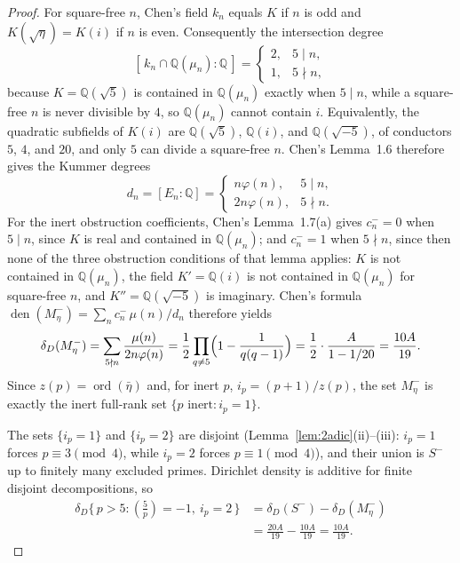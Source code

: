 \documentclass[11pt]{amsart}
\theoremstyle{plain}
\theoremstyle{definition}
\newcommand{\leg}[2]{\left(\frac{#1}{#2}\right)}
\begin{document}
\begin{proof}
For square-free $n$, Chen's field $k_n$ equals $K$ if $n$ is odd and
$K(\sqrt\eta)=K(i)$ if $n$ is even. Consequently the intersection
degree
\[
[\,k_n\cap\mathbb Q(\mu_n):\mathbb Q\,]
=
\begin{cases}
2,&5\mid n,\\
1,&5\nmid n,
\end{cases}
\]
because $K=\mathbb Q(\sqrt5)$ is contained in $\mathbb Q(\mu_n)$
exactly when $5\mid n$, while a square-free $n$ is never divisible
by $4$, so $\mathbb Q(\mu_n)$ cannot contain $i$. Equivalently, the
quadratic subfields of $K(i)$ are $\mathbb Q(\sqrt5)$, $\mathbb Q(i)$,
and $\mathbb Q(\sqrt{-5})$, of conductors $5$, $4$, and $20$, and only
$5$ can divide a square-free $n$. Chen's
Lemma~1.6 \cite{Chen2002} therefore gives the Kummer degrees
\[
d_n=[E_n:\mathbb Q]=
\begin{cases}
n\varphi(n),&5\mid n,\\[2pt]
2n\varphi(n),&5\nmid n.
\end{cases}
\]
For the inert obstruction coefficients, Chen's Lemma~1.7(a)
\cite{Chen2002} gives $c_n^-=0$ when $5\mid n$, since $K$ is real
and contained in $\mathbb Q(\mu_n)$; and $c_n^-=1$ when
$5\nmid n$, since then none of the three obstruction conditions of
that lemma applies: $K$ is not contained in $\mathbb Q(\mu_n)$, the
field $K'=\mathbb Q(i)$ is not contained in $\mathbb Q(\mu_n)$ for
square-free $n$, and $K''=\mathbb Q(\sqrt{-5})$ is imaginary.
Chen's formula
$\operatorname{den}(M_\eta^-)=\sum_n c_n^-\,\mu(n)/d_n$
\cite[Theorem~2.1]{Chen2002} therefore yields
\[
\delta_D(M_\eta^-)
=\sum_{5\nmid n}\frac{\mu(n)}{2n\varphi(n)}
=\frac12\prod_{q\ne5}\Bigl(1-\frac1{q(q-1)}\Bigr)
=\frac12\cdot\frac{A}{1-1/20}
=\frac{10A}{19}.
\]
Since $z(p)=\operatorname{ord}(\bar\eta)$ and, for inert $p$,
$i_p=(p+1)/z(p)$, the set $M_\eta^-$ is exactly the inert full-rank
set $\{p\text{ inert}: i_p=1\}$.

The sets $\{i_p=1\}$ and $\{i_p=2\}$ are disjoint
(Lemma~\ref{lem:2adic}(ii)--(iii): $i_p=1$ forces
$p\equiv3\pmod4$, while $i_p=2$ forces $p\equiv1\pmod4$), and their
union is $S^-$ up to finitely many excluded primes. Dirichlet
density is additive for finite disjoint decompositions, so
\[
\begin{aligned}
\delta_D\{\,p>5:\leg{5}{p}=-1,\ i_p=2\,\}
&=\delta_D(S^-)-\delta_D(M_\eta^-)\\
&=\frac{20A}{19}-\frac{10A}{19}
=\frac{10A}{19}.
\end{aligned}
\]
\end{proof}
\end{document}
